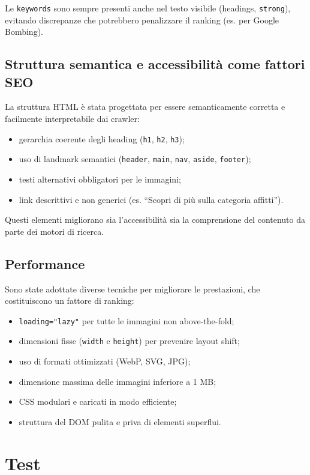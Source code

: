 \documentclass[a4paper,12pt]{article}
\begin{document}
Le \texttt{keywords} sono sempre presenti anche nel testo visibile (headings, \texttt{strong}), evitando discrepanze che potrebbero penalizzare il ranking (es. per Google Bombing).

\subsection{Struttura semantica e accessibilità come fattori SEO}
La struttura HTML è stata progettata per essere semanticamente corretta e facilmente interpretabile dai crawler:

\begin{itemize}
    \item gerarchia coerente degli heading (\texttt{h1}, \texttt{h2}, \texttt{h3});
    \item uso di landmark semantici (\texttt{header}, \texttt{main}, \texttt{nav}, \texttt{aside}, \texttt{footer});
    \item testi alternativi obbligatori per le immagini;
    \item link descrittivi e non generici (es. ``Scopri di più sulla categoria affitti'').
\end{itemize}

Questi elementi migliorano sia l’accessibilità sia la comprensione del contenuto da parte dei motori di ricerca.

\subsection{Performance}
Sono state adottate diverse tecniche per migliorare le prestazioni, che costituiscono un fattore di ranking:

\begin{itemize}
    \item \texttt{loading="lazy"} per tutte le immagini non above-the-fold;
    \item dimensioni fisse (\texttt{width} e \texttt{height}) per prevenire layout shift;
    \item uso di formati ottimizzati (WebP, SVG, JPG);
    \item dimensione massima delle immagini inferiore a 1 MB;
    \item CSS modulari e caricati in modo efficiente;
    \item struttura del DOM pulita e priva di elementi superflui.
\end{itemize}

\section{Test}
\end{document}
